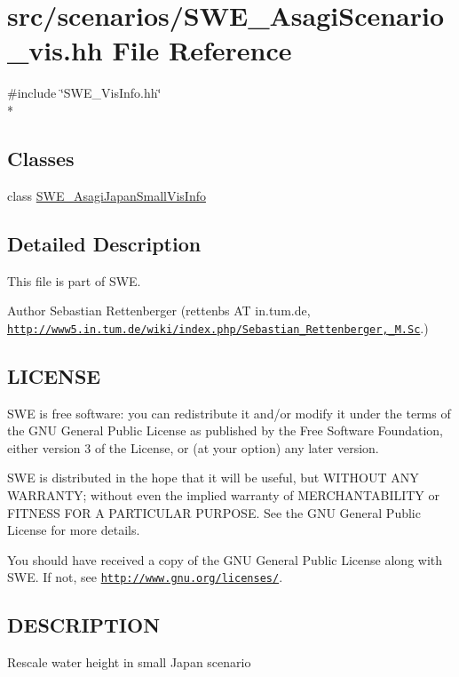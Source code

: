 \hypertarget{SWE__AsagiScenario__vis_8hh}{\section{src/scenarios/\-S\-W\-E\-\_\-\-Asagi\-Scenario\-\_\-vis.hh File Reference}
\label{SWE__AsagiScenario__vis_8hh}
}
{\ttfamily \#include \char`\"{}S\-W\-E\-\_\-\-Vis\-Info.\-hh\char`\"{}}\\*
\subsection*{Classes}
\begin{DoxyCompactItemize}
\item 
class \hyperlink{classSWE__AsagiJapanSmallVisInfo}{S\-W\-E\-\_\-\-Asagi\-Japan\-Small\-Vis\-Info}
\end{DoxyCompactItemize}


\subsection{Detailed Description}
This file is part of S\-W\-E.

\begin{DoxyAuthor}{Author}
Sebastian Rettenberger (rettenbs A\-T in.\-tum.\-de, \href{http://www5.in.tum.de/wiki/index.php/Sebastian_Rettenberger,_M.Sc}{\tt http\-://www5.\-in.\-tum.\-de/wiki/index.\-php/\-Sebastian\-\_\-\-Rettenberger,\-\_\-\-M.\-Sc}.)
\end{DoxyAuthor}
\hypertarget{Writer_8hh_LICENSE}{}\subsection{L\-I\-C\-E\-N\-S\-E}\label{Writer_8hh_LICENSE}
S\-W\-E is free software\-: you can redistribute it and/or modify it under the terms of the G\-N\-U General Public License as published by the Free Software Foundation, either version 3 of the License, or (at your option) any later version.

S\-W\-E is distributed in the hope that it will be useful, but W\-I\-T\-H\-O\-U\-T A\-N\-Y W\-A\-R\-R\-A\-N\-T\-Y; without even the implied warranty of M\-E\-R\-C\-H\-A\-N\-T\-A\-B\-I\-L\-I\-T\-Y or F\-I\-T\-N\-E\-S\-S F\-O\-R A P\-A\-R\-T\-I\-C\-U\-L\-A\-R P\-U\-R\-P\-O\-S\-E. See the G\-N\-U General Public License for more details.

You should have received a copy of the G\-N\-U General Public License along with S\-W\-E. If not, see \href{http://www.gnu.org/licenses/}{\tt http\-://www.\-gnu.\-org/licenses/}.\hypertarget{NetCdfWriter_8hh_DESCRIPTION}{}\subsection{D\-E\-S\-C\-R\-I\-P\-T\-I\-O\-N}\label{NetCdfWriter_8hh_DESCRIPTION}
Rescale water height in small Japan scenario 